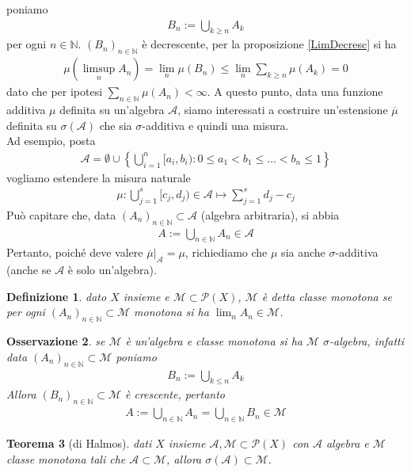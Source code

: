 \documentclass[oneside, 11pt]{amsbook}
\makeatletter
\newcommand{\0}{{(0)}}
\newcommand{\3}{{(3)}}
\theoremstyle{colonplain}
\newtheorem{thm}{Teorema}[chapter]
\theoremstyle{colondefinition}
\newtheorem{defn}[thm]{Definizione}
\theoremstyle{colonremark}
\newtheorem{rmk}[thm]{Osservazione}
\numberwithin{equation}{chapter}
\renewcommand{\proofname}{Dimostrazione}
\renewenvironment{proof}[1][\proofname]{\par
  \pushQED{\qed}%
  \normalfont \topsep6\p@\@plus6\p@\relax
  \trivlist
  \item[\hskip\labelsep\bfseries #1:]\ignorespaces
}{%
  \popQED\endtrivlist\@endpefalse
}
\makeatother
\begin{document}
\begin{proof}
poniamo
\begin{align}
    B_n := \bigcup_{k \geq n} A_k
\end{align}
per ogni $n \in \mathbb{N}$. $(B_n)_{n \in \mathbb{N}}$ è decrescente, per la proposizione \ref{LimDecresc} si ha
\begin{align}
    \mu(\limsup_n A_n) = \lim_n \mu(B_n) \leq \lim_n \sum_{k \geq n} \mu(A_k) = 0
\end{align}
dato che per ipotesi $\sum_{n \in \mathbb{N}} \mu(A_n) < \infty$.
\end{proof}
A questo punto, data una funzione additiva $\mu$ definita su un'algebra $\mathcal{A}$, siamo interessati a costruire un'estensione $\overline{\mu}$ definita su $\sigma(\mathcal{A})$ che sia $\sigma$-additiva e quindi una misura. \\
Ad esempio, posta
\begin{align}
    \mathcal{A} = \emptyset \cup \left\{\bigcup_{i = 1}^n [a_i, b_i) : 0 \leq a_1 < b_1 \leq \dots < b_n \leq 1\right\}
\end{align}
vogliamo estendere la misura naturale
\begin{align}
    \mu : \bigcup_{j = 1}^s [c_j, d_j) \in \mathcal{A} \mapsto \sum_{j = 1}^s d_j - c_j
\end{align}
Può capitare che, data $(A_n)_{n \in \mathbb{N}} \subset \mathcal{A}$ (algebra arbitraria), si abbia
\begin{align}
    A := \bigcup_{n \in \mathbb{N}} A_n \in \mathcal{A}
\end{align}
Pertanto, poiché deve valere $\overline{\mu}|_{\mathcal{A}} = \mu$, richiediamo che $\mu$ sia anche $\sigma$-additiva (anche se $\mathcal{A}$ è solo un'algebra).
\begin{defn}
dato $X$ insieme e $\mathcal{M} \subset \mathcal{P}(X)$, $\mathcal{M}$ è detta \textit{classe monotona} se per ogni $(A_n)_{n \in \mathbb{N}} \subset \mathcal{M}$ monotona si ha $\lim_n A_n \in \mathcal{M}$.
\end{defn}
\begin{rmk}
se $\mathcal{M}$ è un'algebra e classe monotona si ha $\mathcal{M}$ $\sigma$-algebra, infatti data $(A_n)_{n \in \mathbb{N}} \subset \mathcal{M}$ poniamo
\begin{align}
    B_n := \bigcup_{k \leq n} A_k
\end{align}
Allora $(B_n)_{n \in \mathbb{N}} \subset \mathcal{M}$ è crescente, pertanto
\begin{align}
    A := \bigcup_{n \in \mathbb{N}} A_n = \bigcup_{n \in \mathbb{N}} B_n \in \mathcal{M}
\end{align}
\end{rmk}
\begin{thm}[di Halmos]\label{ThmHalm}
dati $X$ insieme $\mathcal{A}, \mathcal{M} \subset \mathcal{P}(X)$ con $\mathcal{A}$ algebra e $\mathcal{M}$ classe monotona tali che $\mathcal{A} \subset \mathcal{M}$, allora $\sigma(\mathcal{A}) \subset \mathcal{M}$.
\end{thm}
\end{document}
